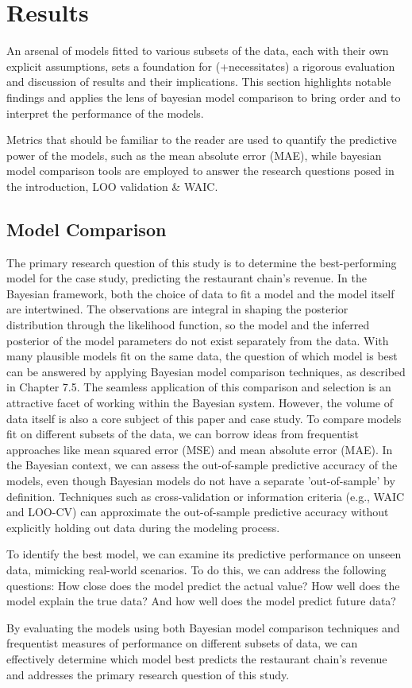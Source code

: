 \section{Results}

An arsenal of models fitted to various subsets of the data, each with their own
explicit assumptions, sets a foundation for (+necessitates) a rigorous evaluation
and discussion of results and their implications. This section highlights notable
findings and applies the lens of bayesian model comparison to bring order and 
to interpret the performance of the models. 

Metrics that should be familiar to the reader are used to quantify the predictive
power of the models, such as the mean absolute error (MAE), while bayesian model 
comparison tools are employed to answer the research questions posed in the 
introduction, LOO validation \& WAIC.

\subsection{Model Comparison}

The primary research question of this study is to determine the best-performing
model for the case study, predicting the restaurant chain's revenue. In the
Bayesian framework, both the choice of data to fit a model and the model itself
are intertwined. The observations are integral in shaping the posterior
distribution through the likelihood function, so the model and the inferred
posterior of the model parameters do not exist separately from the data.
With many plausible models fit on the same data, the question of which model is
best can be answered by applying Bayesian model comparison techniques, as
described in \cite{statrethinking} Chapter 7.5. The seamless application of
this comparison and selection is an attractive facet of working within the
Bayesian system.
However, the volume of data itself is also a core subject of this paper and
case study. To compare models fit on different subsets of the data, we can
borrow ideas from frequentist approaches like mean squared error (MSE) and mean
absolute error (MAE).
In the Bayesian context, we can assess the out-of-sample predictive accuracy of
the models, even though Bayesian models do not have a separate 'out-of-sample'
by definition. Techniques such as cross-validation or information criteria
(e.g., WAIC and LOO-CV) can approximate the out-of-sample predictive accuracy
without explicitly holding out data during the modeling process.

To identify the best model, we can examine its predictive performance on unseen
data, mimicking real-world scenarios. To do this, we can address the following
questions: How close does the model predict the actual value? How well does the
model explain the true data? And how well does the model predict future data?

By evaluating the models using both Bayesian model comparison techniques and
frequentist measures of performance on different subsets of data, we can
effectively determine which model best predicts the restaurant chain's revenue
and addresses the primary research question of this study.
